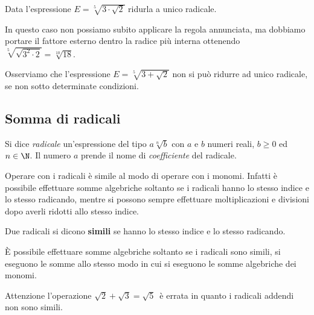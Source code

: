 \begin{esempio}{}{}
Data l'espressione \(E=\sqrt[5]{3\cdot\sqrt{2}}\) ridurla a unico 
radicale.

In questo caso non possiamo subito applicare la regola annunciata, ma 
dobbiamo  portare il fattore esterno dentro la radice più interna 
ottenendo \(\sqrt[5]{\sqrt{3^2 \cdot 2}}=\sqrt[10]{18}\).

Osserviamo che l'espressione \(E=\sqrt[5]{3+\sqrt{2}}\) non si può 
ridurre ad unico radicale, se non sotto determinate condizioni.
\end{esempio}
% 

\subsection{Somma di radicali}

Si dice \emph{radicale} un'espressione del tipo \(a\sqrt[n]b\) con 
\(a\) e \(b\) numeri reali, \(b \geqslant 0\) ed \(n\in \N\). 
Il numero \(a\) prende il nome di \emph{coefficiente} del radicale.

Operare con i radicali è simile al modo di operare con i monomi. 
Infatti è possibile effettuare somme algebriche soltanto se i radicali 
hanno lo stesso indice e lo stesso radicando, mentre si possono sempre 
effettuare moltiplicazioni e divisioni dopo averli ridotti allo stesso 
indice.
\begin{definizione}{}{}
Due radicali si dicono \textbf{simili} se hanno lo stesso indice e lo 
stesso radicando.
\end{definizione}

È possibile effettuare somme algebriche soltanto se i radicali sono 
simili, si eseguono le somme allo stesso modo in cui si eseguono le 
somme algebriche dei monomi.

Attenzione l'operazione \(\sqrt{2}+\sqrt{3}=\sqrt 5\)\, è errata in 
quanto i radicali addendi non sono simili.


